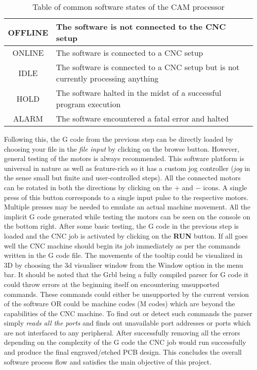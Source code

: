 \begin{table}[h]
 \def\arraystretch{1.5}
 \begin{center}
  \caption{Table of common software states of the CAM processor}
  \begin{tabular}{|c|l|}
   \hline
   OFFLINE & The software is not connected to the CNC setup                                    \\
   \hline
   ONLINE  & The software is connected to a CNC setup                                          \\
   \hline
   IDLE    & The software is connected to a CNC setup but is not currently processing anything \\
   \hline
   HOLD    & The software halted in the midst of a successful program execution                \\
   \hline
   ALARM   & The software encountered a fatal error and halted                                 \\
   \hline
  \end{tabular}
 \end{center}
 \label{tab:soft_states}
\end{table}


Following this, the G code from the previous step can be directly loaded by choosing your file in the \textit{file input} by clicking on the browse button. However, general testing of the motors is always recommended. This software platform is universal in nature as well as feature-rich so it has a custom jog controller (\textit{jog} in the sense small but finite and user-controlled steps). All the connected motors can be rotated in both the directions by clicking on the $\boldsymbol{+}$ and $\boldsymbol{-}$ icons. A single press of this button corresponds to a single input pulse to the respective motors. Multiple presses may be needed to emulate an actual machine movement. All the implicit G code generated while testing the motors can be seen on the console on the bottom right. After some basic testing, the G code in the previous step is loaded and the CNC job is activated by clicking on the \textbf{RUN} button. If all goes well the CNC machine should begin its job immediately as per the commands written in the G code file. The movements of the tooltip could be visualized in 3D by choosing the 3d visualiser window from the Window option in the menu bar. It should be noted that the Grbl being a fully compiled parser for G code it could throw errors at the beginning itself on encountering unsupported commands. These commands could either be unsupported by the current version of the software OR could be machine codes (M codes) which are beyond the capabilities of the CNC machine. To find out or detect such commands the parser simply \textit{reads all the ports} and finds out unavailable port addresses or ports which are not interfaced to any peripheral. After successfully removing all the errors depending on the complexity of the G code the CNC job would run successfully and produce the final engraved/etched PCB design. This concludes the overall software process flow and satisfies the main objective of this project.


